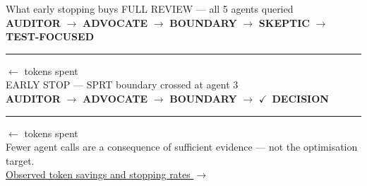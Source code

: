 \documentclass[10pt]{beamer}
\begin{document}
\begin{frame}{What early stopping buys}
  \footnotesize
  {\color{gray} FULL REVIEW — all 5 agents queried}\\[3pt]
  \textcolor{auditor}{\textbf{AUDITOR}} $\to$
  \textcolor{advocate}{\textbf{ADVOCATE}} $\to$
  \textcolor{boundary}{\textbf{BOUNDARY}} $\to$
  \textcolor{skeptic}{\textbf{SKEPTIC}} $\to$
  \textcolor{testfoc}{\textbf{TEST-FOCUSED}}\\[2pt]
  {\color{gray!35}\rule{\linewidth}{4pt}}
  \hspace{0.2em}\scriptsize\color{gray}$\leftarrow$ tokens spent\\[8pt]

  {\color{gray} EARLY STOP — SPRT boundary crossed at agent 3}\\[3pt]
  \textcolor{auditor}{\textbf{AUDITOR}} $\to$
  \textcolor{advocate}{\textbf{ADVOCATE}} $\to$
  \textcolor{boundary}{\textbf{BOUNDARY}} $\to$
  \alert{$\checkmark$\ \textbf{DECISION}}\\[2pt]
  {\color{gray!35}\rule{0.60\linewidth}{4pt}}
  \hspace{0.2em}\scriptsize\color{gray}$\leftarrow$ tokens spent\\

  \vfill
  \small
  Fewer agent calls are a consequence of sufficient evidence — not the optimisation target.\\[0.3em]
  \scriptsize
  \href{run:../.warf/token_cost_chart.html}{Observed token savings and stopping rates $\rightarrow$}
\end{frame}
\end{document}
